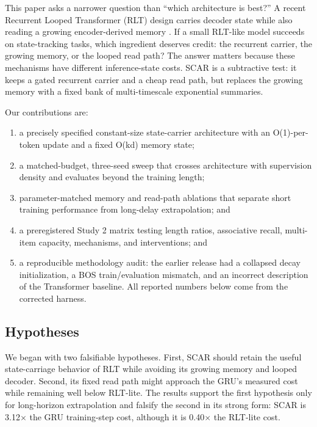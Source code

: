 \documentclass{article}
\begin{document}
This paper asks a narrower question than ``which architecture is best?'' A
recent Recurrent Looped Transformer (RLT) design carries decoder state while
also reading a growing encoder-derived memory \cite{zhang2026rlt}. If a small
RLT-like model succeeds on state-tracking tasks, which ingredient deserves
credit: the recurrent carrier, the growing memory, or the looped read path?
The answer matters because these mechanisms have different inference-state
costs. SCAR is a subtractive test: it keeps a gated recurrent carrier and a
cheap read path, but replaces the growing memory with a fixed bank of
multi-timescale exponential summaries.

Our contributions are:
\begin{enumerate}
\item a precisely specified constant-size state-carrier architecture with an
O(1)-per-token update and a fixed O(kd) memory state;
\item a matched-budget, three-seed sweep that crosses architecture with
supervision density and evaluates beyond the training length;
\item parameter-matched memory and read-path ablations that separate short
training performance from long-delay extrapolation; and
\item a preregistered Study 2 matrix testing length ratios, associative
recall, multi-item capacity, mechanisms, and interventions; and
\item a reproducible methodology audit: the earlier release had a collapsed
decay initialization, a BOS train/evaluation mismatch, and an incorrect
description of the Transformer baseline. All reported numbers below come from
the corrected harness.
\end{enumerate}

\subsection{Hypotheses}
We began with two falsifiable hypotheses. First, SCAR should retain the useful
state-carriage behavior of RLT while avoiding its growing memory and looped
decoder. Second, its fixed read path might approach the GRU's measured cost
while remaining well below RLT-lite. The results support the first hypothesis
only for long-horizon extrapolation and falsify the second in its strong form:
SCAR is 3.12$\times$ the GRU training-step cost, although it is 0.40$\times$
the RLT-lite cost.
\end{document}
